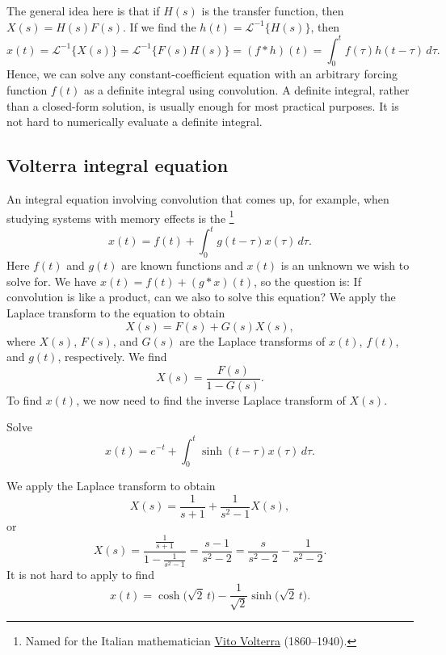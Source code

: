 The general idea here is that if $H(s)$ is the transfer function, then
$X(s)=H(s)F(s)$.
If we find the $h(t) = {\mathcal{L}}^{-1}\bigl\{ H(s) \bigr\}$, then
\begin{equation*}
x(t)
= {\mathcal{L}}^{-1}\bigl\{ X(s) \bigr\}
= {\mathcal{L}}^{-1}\bigl\{ F(s)H(s) \bigr\}
= (f * h)(t)
= \int_0^t f(\tau) h(t-\tau) \, d\tau .
\end{equation*}
Hence,
we can solve any constant-coefficient equation with an arbitrary forcing
function $f(t)$ as a definite integral using convolution.
A definite integral, rather than a closed-form solution, is usually enough
for most practical purposes.  It is
not hard to numerically evaluate a definite integral.

\subsection{Volterra integral equation}

An integral equation
involving convolution
that comes up, for example, when studying systems with memory effects
is the \emph{}%
\footnote{Named for the Italian mathematician
\href{https://en.wikipedia.org/wiki/Vito_Volterra}{Vito Volterra}
(1860--1940).}
\begin{equation*}
x(t) = f(t) + \int_0^t g(t-\tau) x(\tau) \, d\tau .
\end{equation*}
Here $f(t)$ and $g(t)$ are known functions and $x(t)$ is an unknown we
wish to solve for.
We have $x(t) = f(t) + (g * x)(t)$, so the question is:
If convolution is
like a product, can we also  to solve this equation?
We apply the Laplace transform to the equation to obtain 
\begin{equation*}
X(s) = F(s) + G(s) X(s) ,
\end{equation*}
where $X(s)$, $F(s)$, and $G(s)$ are the Laplace transforms of $x(t)$, $f(t)$, and
$g(t)$, respectively.  We find
\begin{equation*}
X(s) = \frac{F(s)}{1-G(s)} .
\end{equation*}
To find $x(t)$, we now need to find the 
inverse Laplace transform of $X(s)$.

\begin{example}
Solve
\begin{equation*}
x(t) =  e^{-t} + \int_0^t \sinh(t-\tau) x(\tau) \, d\tau .
\end{equation*}

We apply the Laplace transform to obtain
\begin{equation*}
X(s) = \frac{1}{s+1} + \frac{1}{s^2-1} X(s) ,
\end{equation*}
or
\begin{equation*}
X(s) = \frac{\frac{1}{s+1}}{1- \frac{1}{s^2-1}}
=
\frac{s-1}{s^2 - 2}
=
\frac{s}{s^2 - 2}
-
\frac{1}{s^2 - 2} .
\end{equation*}
It is not hard to apply  to find
\begin{equation*}
x(t) = \cosh \bigl( \sqrt{2} \, t \bigr) -
\frac{1}{\sqrt{2}} \sinh \bigl( \sqrt{2}\, t \bigr).
\end{equation*}
\end{example}

